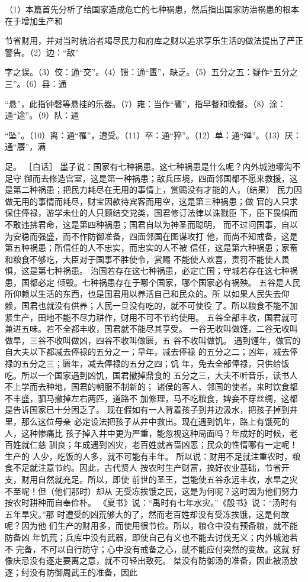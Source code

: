 \documentclass[12pt,UTF8]{ctexbook}
\begin{document}
（1）本篇首先分析了给国家造成危亡的七种祸患，然后指出国家防治祸患的根本在于增加生产和 

节省财用，并对当时统治者竭尽民力和府库之财以追求享乐生活的做法提出了严正警告。（2）边：“敌” 

字之误。（3）佼：通“交”。（4）馈：通“匮”，缺乏。（5）五分之五：疑作“五分之三”。（6）县：通 

“悬”，此指钟磬等悬挂的乐器。（7）雍：当作“饔”，指早餐和晚餐。（8）涂：通“途”。（9）队：通 

“坠”。（10）离：通“罹”，遭受。（11）卒：通“猝”。（12）单：通“殚”。（13）厌：通“餍”，满 

足。 
［白话］ 
墨子说：国家有七种祸患。这七种祸患是什么呢？内外城池壕沟不足守 
御而去修造宫室，这是第一种祸患；敌兵压境，四面邻国都不愿来救援，这 
是第二种祸患；把民力耗尽在无用的事情上，赏赐没有才能的人，（结果） 
民力因做无用的事情而耗尽，财宝因款待宾客而用空，这是第三种祸患；做 
官的人只求保住俸禄，游学未仕的人只顾结交党类，国君修订法律以诛戮臣 
下，臣下畏惧而不敢违拂君命，这是第四种祸患；国君自以为神圣而聪明， 
而不过问国事，自以为安稳而强盛，而不作防御准备，四面邻国在图谋攻打 
他，而尚不知戒备，这是第五种祸患；所信任的人不忠实，而忠实的人不被 
信任，这是第六种祸患；家畜和粮食不够吃，大臣对于国事不胜使令，赏赐 
不能使人欢喜，责罚不能使人畏惧，这是第七种祸患。 
治国若存在这七种祸患，必定亡国；守城若存在这七种祸患，国都必定 
倾毁。七种祸患存在于哪个国家，哪个国家必有祸殃。 
五谷是人民所仰赖以生活的东西，也是国君用以养活自己和民众的。所 
以如果人民失去仰赖，国君也就没有供养；人民一旦没有吃的，就不可使役 
了。所以粮食不能不加紧生产，田地不能不尽力耕作，财用不可不节约使用。 
五谷全部丰收，国君就可兼进五味。若不全都丰收，国君就不能尽其享受。 
一谷无收叫做馑，二谷无收叫做旱，三谷不收叫做凶，四谷不收叫做匮，五 
谷不收叫做饥。 
遇到馑年，做官的自大夫以下都减去俸禄的五分之一；旱年，减去俸禄 
的五分之二；凶年，减去俸禄的五分之三；匮年，减去俸禄的五分之四；饥 
年，免去全部俸禄，只供给饭吃。所以一个国家遇到凶饥，国君撤掉鼎食的 
五分之三，大夫不听音乐，读书人不上学而去种地，国君的朝服不制新的； 
诸侯的客人、邻国的使者，来时饮食都不丰盛，驷马撤掉左右两匹，道路不 
加修理，马不吃粮食，婢妾不穿丝绸，这都是告诉国家已十分困乏了。 
现在假如有一人背着孩子到井边汲水，把孩子掉到井里，那么这位母亲 
必定设法把孩子从井中救出。现在遇到饥年，路上有饿死的人，这种惨痛比 
孩子掉入井中更为严重，能忽视这种局面吗？年成好的时候，老百姓就仁慈 
驯良；年成遇到凶灾，老百姓就吝啬凶恶；民众的性情哪有一定呢！生产的 
人少，吃饭的人多，就不可能有丰年。 
所以说：财用不足就注重农时，粮食不足就注意节约。因此，古代贤人 
按农时生产财富，搞好农业基础，节省开支，财用自然就充足。所以，即使 
前世的圣王，岂能使五谷永远丰收，水旱之灾不至呢！但（他们那时）却从 
无受冻挨饿之民，这是为何呢？这时因为他们努力按农时耕种而自奉俭朴。 
《夏书》说：“禹时有七年水灾。”《殷书》说：“汤时有五年旱灾。”那 
时遭受的凶荒够大的了，然而老百姓却没有受冻挨饿，这是何故呢？因为他 
们生产的财用多，而使用很节俭。所以，粮仓中没有预备粮，就不能防备凶 
年饥荒；兵库中没有武器，即使自己有义也不能去讨伐无义；内外城池若不 
完备，不可以自行防守；心中没有戒备之心，就不能应付突然的变故。这就 
好像庆忌没有逐走要离之意，就不可轻出致死。 
桀没有防御汤的准备，因此被汤放逐；纣没有防御周武王的准备，因此 
\end{document}

